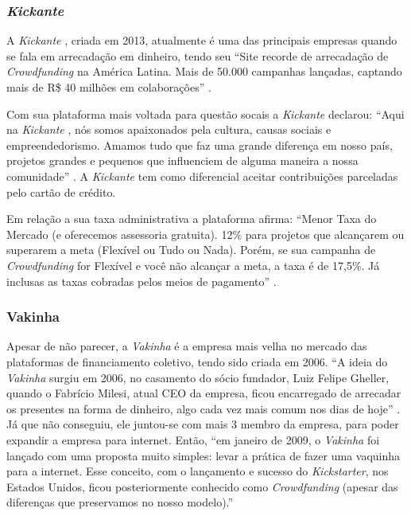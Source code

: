 \documentclass{classe_cn}                 %
\begin{document}
\subsubsection{\textit{Kickante}}

A \textit{Kickante} , criada em 2013, atualmente é uma das principais empresas quando se fala em arrecadação em dinheiro, tendo seu “Site recorde de arrecadação de \textit{Crowdfunding}  na América Latina. Mais de 50.000 campanhas lançadas, captando mais de R\$ 40 milhões em colaborações” \cite{BRASIL:2017}.

Com sua plataforma mais voltada para questão socais a \textit{Kickante}  declarou: “Aqui na \textit{Kickante} , nós somos apaixonados pela cultura, causas sociais e empreendedorismo. Amamos tudo que faz uma grande diferença em nosso país, projetos grandes e pequenos que influenciem de alguma maneira a nossa comunidade” \cite{KICKANTE:2017}. A \textit{Kickante}  tem como diferencial aceitar contribuições parceladas pelo cartão de crédito.

Em relação a sua taxa administrativa a plataforma afirma: “Menor Taxa do Mercado (e oferecemos assessoria gratuita). 12\% para projetos que alcançarem ou superarem a meta (Flexível ou Tudo ou Nada). Porém, se sua campanha de \textit{Crowdfunding}  for Flexível e você não alcançar a meta, a taxa é de 17,5\%. Já inclusas as taxas cobradas pelos meios de pagamento” \cite{BRASIL:2017}.

\subsubsection{Vakinha}

Apesar de não parecer, a \textit{Vakinha} é a empresa mais velha no mercado das plataformas de financiamento coletivo, tendo sido criada em 2006. “A ideia do \textit{Vakinha} surgiu em 2006, no casamento do sócio fundador, Luiz Felipe Gheller, quando o Fabrício Milesi, atual CEO da empresa, ficou encarregado de arrecadar os presentes na forma de dinheiro, algo cada vez mais comum nos dias de hoje” \cite{VAKINHA:2017}. Já que não conseguiu, ele juntou-se com mais 3 membro da empresa, para poder expandir a empresa para internet. Então, “em janeiro de 2009, o \textit{Vakinha} foi lançado com uma proposta muito simples: levar a prática de fazer uma vaquinha para a internet. Esse conceito, com o lançamento e sucesso do \textit{Kickstarter}, nos Estados Unidos, ficou posteriormente conhecido como \textit{Crowdfunding}  (apesar das diferenças que preservamos no nosso modelo).”
\end{document}
